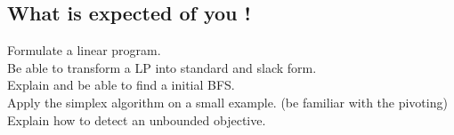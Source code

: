\subsection{What is expected of you !}
Formulate a linear program. \\
Be able to transform a LP into standard and slack form. \\
Explain and be able to find a initial BFS. \\
Apply the simplex algorithm on a small example. (be familiar with the pivoting)\\
Explain how to detect an unbounded objective.